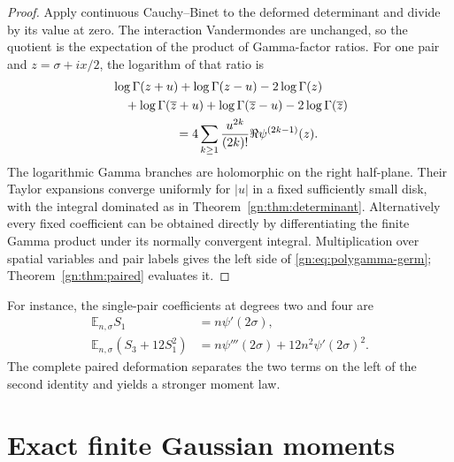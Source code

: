 \documentclass[11pt,a4paper]{article}
\numberwithin{equation}{section}
\theoremstyle{definition}
\theoremstyle{remark}
\begin{document}
\begin{proof}
Apply continuous Cauchy--Binet to the deformed determinant and divide
by its value at zero.  The interaction Vandermondes are unchanged, so
the quotient is the expectation of the product of Gamma-factor ratios.
For one pair and $z=\sigma+ix/2$, the logarithm of that ratio is
\[
\begin{aligned}
 &\log\Gamma(z+u)+\log\Gamma(z-u)-2\log\Gamma(z)\\
 &\quad+\log\Gamma(\overline z+u)+\log\Gamma(\overline z-u)
                         -2\log\Gamma(\overline z)\\
 &\hspace{18mm}=4\sum_{k\ge1}\frac{u^{2k}}{(2k)!}
                                      \Re\psi^{(2k-1)}(z).
\end{aligned}
\]
The logarithmic Gamma branches are holomorphic on the right half-plane.
Their Taylor expansions converge uniformly for $|u|$ in a fixed
sufficiently small disk, with the integral dominated as in
Theorem~\ref{gn:thm:determinant}.  Alternatively every fixed coefficient
can be obtained directly by differentiating the finite Gamma product
under its normally convergent integral.  Multiplication over spatial
variables and pair labels gives the left side of
\eqref{gn:eq:polygamma-germ}; Theorem~\ref{gn:thm:paired} evaluates it.
\end{proof}

For instance, the single-pair coefficients at degrees two and four are
\begin{align}
 \mathbb E_{n,\sigma}S_1
      &=n\psi'(2\sigma),\label{gn:eq:S1-mean}\\
 \mathbb E_{n,\sigma}(S_3+12S_1^2)
      &=n\psi'''(2\sigma)+12n^2\psi'(2\sigma)^2.
          \label{gn:eq:fourth-insertion}
\end{align}
The complete paired deformation separates the two terms on the left
of the second identity and yields a stronger moment law.

\section{Exact finite Gaussian moments}
\label{gn:sec:gaussian}
\end{document}
